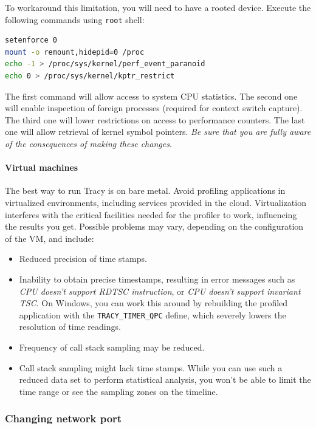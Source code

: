 \documentclass[hidelinks,titlepage,a4paper]{article}
\begin{document}
To workaround this limitation, you will need to have a rooted device. Execute the following commands using \texttt{root} shell:

\begin{lstlisting}[language=sh]
setenforce 0
mount -o remount,hidepid=0 /proc
echo -1 > /proc/sys/kernel/perf_event_paranoid
echo 0 > /proc/sys/kernel/kptr_restrict
\end{lstlisting}

The first command will allow access to system CPU statistics. The second one will enable inspection of foreign processes (required for context switch capture). The third one will lower restrictions on access to performance counters. The last one will allow retrieval of kernel symbol pointers. \emph{Be sure that you are fully aware of the consequences of making these changes.}

\paragraph{Virtual machines}

The best way to run Tracy is on bare metal. Avoid profiling applications in virtualized environments, including services provided in the cloud. Virtualization interferes with the critical facilities needed for the profiler to work, influencing the results you get. Possible problems may vary, depending on the configuration of the VM, and include:

\begin{itemize}
\item Reduced precision of time stamps.
\item Inability to obtain precise timestamps, resulting in error messages such as \emph{CPU doesn't support RDTSC instruction}, or \emph{CPU doesn't support invariant TSC}. On Windows, you can work this around by rebuilding the profiled application with the \texttt{TRACY\_TIMER\_QPC} define, which severely lowers the resolution of time readings.
\item Frequency of call stack sampling may be reduced.
\item Call stack sampling might lack time stamps. While you can use such a reduced data set to perform statistical analysis, you won't be able to limit the time range or see the sampling zones on the timeline.
\end{itemize}

\subsubsection{Changing network port}
\end{document}

